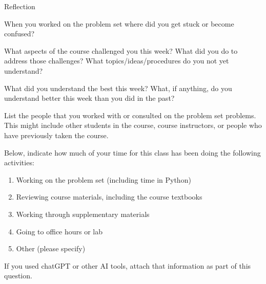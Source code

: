 \documentclass[12pt,letterpaper,noanswers]{exam}
\begin{document}
\begin{questions}
\question Reflection
\begin{parts}
\item When you worked on the problem set where did you get stuck or become confused?
\item What aspects of the course challenged you this week?  What did you do to address those challenges?  What topics/ideas/procedures do you not yet understand?
\item What did you understand the best this week?  What, if anything, do you understand better this week than you did in the past?
\item List the people that you worked with or consulted on the problem set problems.  This might include other students in the course, course instructors, or people who have previously taken the course.
\item Below, indicate how much of your time for this class has been doing the following activities:
	\begin{enumerate}
	\item Working on the problem set (including time in Python)
	\item Reviewing course materials, including the course textbooks
	\item Working through supplementary materials
	\item Going to office hours or lab
	\item Other (please specify)
	\end{enumerate}
\item If you used chatGPT or other AI tools, attach that information as part of this question.
\end{parts}

\end{questions}
\end{document}
